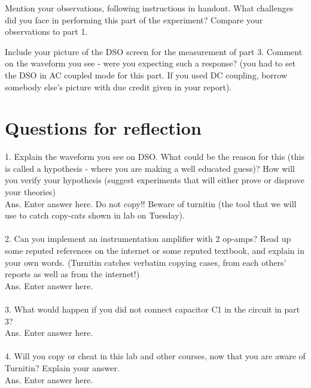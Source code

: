﻿\documentclass[12pt]{article}
\begin{document}
Mention your observations, following instructions in handout. What challenges did you face in performing this part of the experiment? Compare your observations to part 1.

Include your picture of the DSO screen for the measurement of part 3. Comment on the waveform  you see - were you expecting such a response? (you had to set the DSO in AC coupled mode for this part. If you used DC coupling, borrow somebody else's picture with due credit given in your report).

\section{Questions for reflection}

1. Explain the waveform you see on DSO. What could be the reason for this (this is called a hypothesis - where you are making a well educated guess)? How will you verify your hypothesis (suggest experiments that will either prove or disprove your theories)\\
Ans. Enter answer here. Do not copy!! Beware of turnitin (the tool that we will use to catch copy-cats shown in lab on Tuesday).
\\\\
2. Can you implement an instrumentation amplifier with 2 op-amps? Read up some reputed references on the internet or some reputed textbook, and explain in your own words. (Turnitin catches verbatim copying cases, from each others' reports as well as from the internet!)\\
Ans. Enter answer here.
\\\\
3. What would happen if you did not connect capacitor C1 in the circuit in part 3?\\
Ans. Enter answer here.
\\\\
4. Will you copy or cheat in this lab and other courses, now that you are aware of Turnitin? Explain your answer.\\
Ans. Enter answer here.
\end{document}

